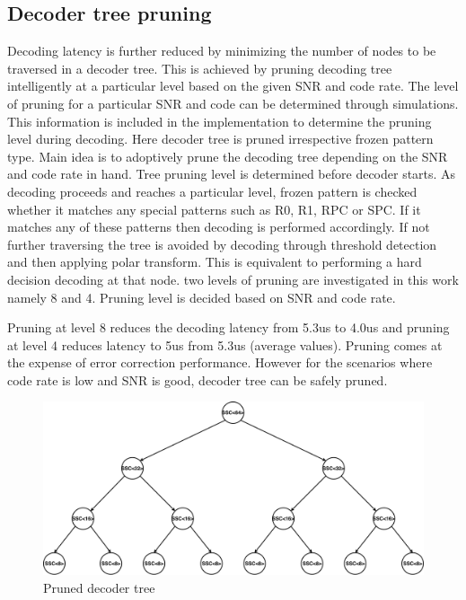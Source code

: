 \subsection{Decoder tree pruning}
Decoding latency is further reduced by minimizing the number of nodes to be traversed in a decoder tree. This is achieved by pruning decoding tree intelligently at a particular level based on the given SNR and code rate. The level of pruning for a particular SNR and code can be determined through simulations. This information is included in the implementation to determine the pruning level during decoding. Here decoder tree is pruned irrespective frozen pattern type. Main idea is to adoptively prune the decoding tree depending on the SNR and code rate in hand. Tree pruning level is determined before decoder starts. As decoding proceeds and reaches a particular level, frozen pattern is checked whether it matches any special patterns such as R0, R1, RPC or SPC. If it matches any of these patterns then decoding is performed accordingly. If not further traversing the tree is avoided by decoding through threshold detection and then applying polar transform. This is equivalent to performing a hard decision decoding at that node. two levels of pruning are investigated in this work namely 8 and 4. Pruning level is decided based on SNR and code rate.

Pruning at level 8 reduces the decoding latency from 5.3us to 4.0us and pruning at level 4 reduces latency to 5us from 5.3us (average values). Pruning comes at the expense of error correction performance. However for the scenarios where code rate is low and SNR is good, decoder tree can be safely pruned.


\begin{figure}[]
	\centering
	\includegraphics[width=1\textwidth]{./figures/prunedDecoderTree.pdf}
	\caption{Pruned decoder tree}
	\label{fig:prunedDecoderTree}
\end{figure}

